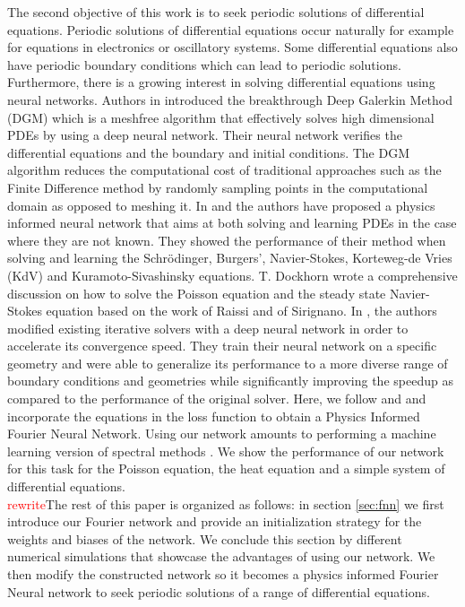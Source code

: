 \documentclass[11pt]{article}
\begin{document}
The second objective of this work is to seek periodic solutions of differential equations. Periodic solutions of differential equations occur naturally for example for equations in electronics or oscillatory systems. Some differential equations also have periodic boundary conditions which can lead to periodic solutions. Furthermore, there is a growing interest in solving differential equations using neural networks. Authors in \cite{Sirignano} introduced the breakthrough Deep Galerkin Method (DGM) which is a meshfree algorithm that effectively solves high dimensional PDEs by using a deep neural network. Their neural network verifies the differential equations and the boundary and initial conditions. The DGM algorithm reduces the computational cost of traditional approaches such as the Finite Difference method by randomly sampling points in the computational domain as opposed to meshing it. In \cite{raissi2017hidden} and \cite{Raissi} the authors have proposed a physics informed neural network that aims at both solving and learning PDEs in the case where they are not known. They showed the performance of their method when solving and learning the Schrödinger, Burgers', Navier-Stokes, Korteweg-de Vries (KdV) and Kuramoto-Sivashinsky equations. T. Dockhorn \cite{Dockhorn} wrote a comprehensive discussion on how to solve the Poisson equation and the steady state Navier-Stokes equation based on the work of Raissi and of Sirignano. In \cite{hsieh2019learning}, the authors modified existing iterative solvers with a deep neural network in order to accelerate its convergence speed. They train their neural network on a specific geometry and were able to generalize its performance to a more diverse range of boundary conditions and geometries while significantly improving the speedup as compared to the performance of the original solver. Here, we follow \cite{Raissi} and \cite{Sirignano} and incorporate the equations in the loss function to obtain a Physics Informed Fourier Neural Network. Using our network amounts to performing a machine learning version of spectral methods \cite{Trefethen2000}. We show the performance of our network for this task for the Poisson equation, the heat equation and a simple system of differential equations.\\

\textcolor{red}{rewrite}The rest of this paper is organized as follows: in section \ref{sec:fnn} we first introduce our Fourier network and provide an initialization strategy for the weights and biases of the network. We conclude this section by different numerical simulations that showcase the advantages of using our network. We then modify the constructed network so it becomes a physics informed Fourier Neural network to seek periodic solutions of a range of differential equations. 
\end{document}

